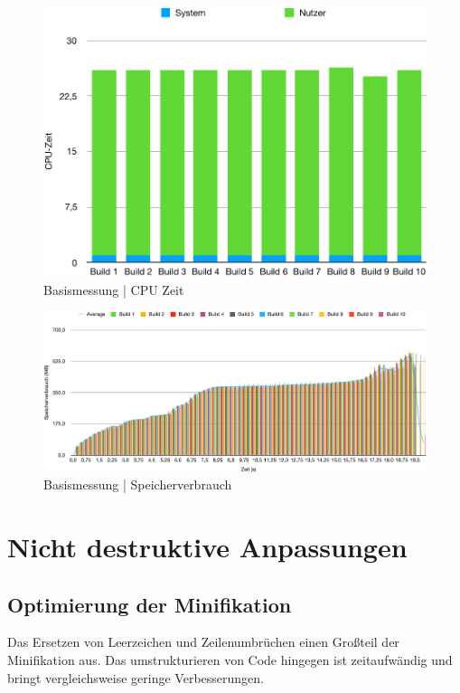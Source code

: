 \documentclass[11pt]{report}
\begin{document}
			\begin{figure}[p]
	            \includegraphics[width=\textwidth]{img/baseline_duration.pdf}
	            \caption{Basismessung | CPU Zeit}
	            \label{figure:baseline_duration}
	        \end{figure}
	        \begin{figure}[p]
	            \includegraphics[width=\textwidth]{img/baseline_memory.pdf}
	            \caption{Basismessung | Speicherverbrauch}
	            \label{figure:baseline_memory}
	        \end{figure}

        \section{Nicht destruktive Anpassungen}
        	\label{section:productionOptimizations}
        	\subsection{Optimierung der Minifikation}
        		\label{section:minification}
	        	Das Ersetzen von Leerzeichen und Zeilenumbrüchen einen Großteil der Minifikation aus. Das umstrukturieren von Code hingegen ist zeitaufwändig und bringt vergleichsweise geringe Verbesserungen\cite{optimization-source:minify}.
\end{document}

